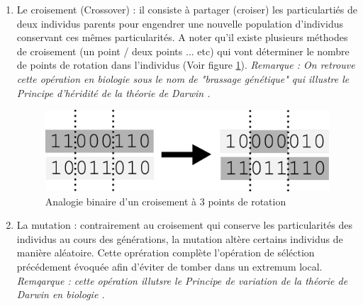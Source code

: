 \documentclass[12pt]{report}
\begin{document}
        \begin{enumerate}
          \item Le croisement (Crossover) :
          il consiste à partager (croiser) les particulartiés de deux individus parents pour engendrer une nouvelle population d'individus conservant ces mêmes particularités. A noter qu'il existe plusieurs méthodes de croisement (un point / deux points ... etc) qui vont déterminer le nombre de points de rotation dans l'individus (Voir figure \ref{sch_crossover}).
          \emph{Remarque : On retrouve cette opération en biologie sous le nom de "brassage génétique" qui illustre le Principe d'héridité de la théorie de Darwin \cite{darwin}.}
          \begin{figure}[h]
            \centering
            \includegraphics{img/crossover.png}
            \caption{Analogie binaire d'un croisement à 3 points de rotation}
            \label{sch_crossover}
          \end{figure}
          \item La mutation :
          contrairement au croisement qui conserve les particularités des individus au cours des générations, la mutation altère certains individus de manière aléatoire. Cette oprération complète l'opération de séléction précédement évoquée afin d'éviter de tomber dans un extremum local.
          \emph{Remqarque : cette opération illutsre le Principe de variation de la théorie de Darwin en biologie \cite{darwin}.}
        \end{enumerate}
\end{document}
